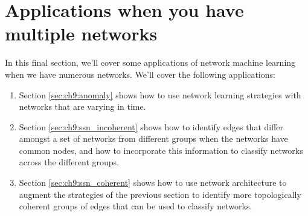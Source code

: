 \chapter{Applications when you have multiple networks}
\label{sec:ch9}

In this final section, we'll cover some applications of network machine learning when we have numerous networks. We'll cover the following applications:

\begin{enumerate}
    \item Section \ref{sec:ch9:anomaly} shows how to use network learning strategies with networks that are varying in time.
    \item Section \ref{sec:ch9:ssn_incoherent} shows how to identify edges that differ amongst a set of networks from different groups when the networks have common nodes, and how to incorporate this information to classify networks across the different groups.
    \item Section \ref{sec:ch9:ssn_coherent} shows how to use network architecture to augment the strategies of the previous section to identify more topologically coherent groups of edges that can be used to classify networks.
\end{enumerate}






